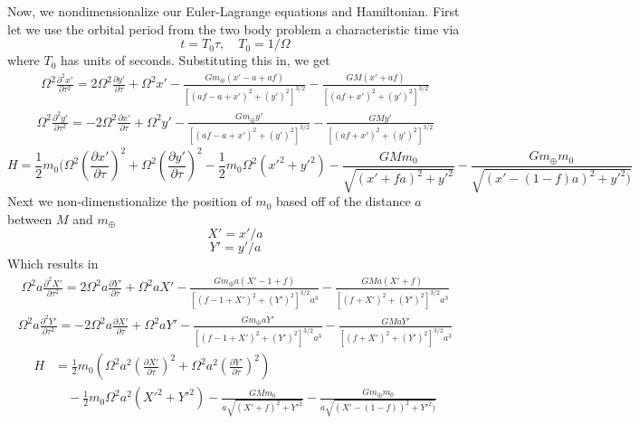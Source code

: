 \documentclass[11pt]{article}
\begin{document}
Now, we nondimensionalize our Euler-Lagrange equations and Hamiltonian. First let we use the orbital period from the two body problem a characteristic time via
\begin{equation}
    t=T_0\tau, \quad T_0=1/\Omega
\end{equation}
where $T_0$ has units of seconds.
Substituting this in, we get
\begin{align}
    \Omega^2 \frac{\partial^2 x'}{\partial \tau^2}
    =2 \Omega^2 \frac{\partial y'}{\partial \tau}
    +\Omega ^2 x' - \frac{Gm_\oplus (x'-a+af)}{[(af-a+x')^2 +(y') ^2]^{3/2}} -\frac{GM (x'+af)}{[(af+x')^2 +(y') ^2]^{3/2}}
\end{align}
\begin{align}
    \Omega^2 \frac{\partial^2 y'}{\partial \tau^2}
    =-2 \Omega^2 \frac{\partial x'}{\partial \tau}
    +\Omega ^2 y' - \frac{Gm_\oplus y'}{[(af-a+x')^2 +(y') ^2]^{3/2}} -\frac{GM y'}{[(af+x')^2 +(y') ^2]^{3/2}}
\end{align}
\begin{equation}
    H = \frac{1}{2}m_{0}(\Omega^2 (\frac{\partial x'}{\partial \tau})^2 + \Omega^2 (\frac{\partial y'}{\partial \tau})^2 - \frac{1}{2} m_{0}\Omega^2(x'^2 + y'^2)  - \frac{GMm_{0}}{\sqrt{(x'+fa)^2 + y'^2}} - \frac{Gm_\oplus m_{0}}{\sqrt{(x'-(1-f)a)^2 + y'^2)}}
\end{equation}
Next we non-dimenstionalize the position of $m_0$ based off of the distance $a$ between $M$ and $m_\oplus$
\begin{equation}
    X'=x'/a
\end{equation}
\begin{equation}
    Y'=y'/a
\end{equation}
Which results in
\begin{align}
    \Omega^2 a \frac{\partial^2 X'}{\partial \tau^2}
    =2 \Omega^2 a\frac{\partial Y'}{\partial \tau}
    +\Omega ^2 aX' - \frac{Gm_\oplus a(X'-1+f)}{[(f-1+X')^2 +(Y') ^2]^{3/2}a^3} -\frac{GM a(X'+f)}{[(f+X')^2 +(Y') ^2]^{3/2}a^3}
\end{align}
\begin{align}
    \Omega^2 a \frac{\partial^2 Y'}{\partial \tau^2}
    =-2 \Omega^2 a\frac{\partial X'}{\partial \tau}
    +\Omega ^2 aY' - \frac{Gm_\oplus aY'}{[(f-1+X')^2 +(Y') ^2]^{3/2}a^3} -\frac{GM aY'}{[(f+X')^2 +(Y') ^2]^{3/2}a^3}
\end{align}
\begin{align}
    H &= \frac{1}{2}m_{0}\left(\Omega^2 a^2 \left(\frac{\partial X'}{\partial \tau}\right)^2 + \Omega^2 a^2 \left(\frac{\partial Y'}{\partial \tau}\right)^2 \right) \nonumber \\
    & \quad - \frac{1}{2} m_{0}\Omega^2 a^2(X'^2 + Y'^2)   - \frac{GMm_{0}}{a\sqrt{(X'+f)^2 + Y'^2}} - \frac{Gm_\oplus m_{0}}{a\sqrt{(X'-(1-f))^2 + Y'^2)}}
\end{align}
\end{document}
